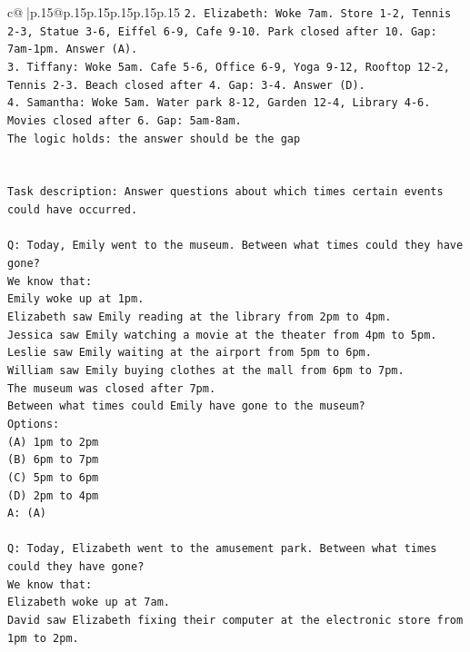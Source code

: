 \documentclass{article}
\begin{document}
{\begin{supertabular}{c@{$\;$}|p{.15\linewidth}@{}p{.15\linewidth}p{.15\linewidth}p{.15\linewidth}p{.15\linewidth}p{.15\linewidth}}
{{{\texttt{2. Elizabeth: Woke 7am. Store 1{-}2, Tennis 2{-}3, Statue 3{-}6, Eiffel 6{-}9, Cafe 9{-}10. Park closed after 10. Gap: 7am{-}1pm. Answer (A).} \\
\texttt{3. Tiffany: Woke 5am. Cafe 5{-}6, Office 6{-}9, Yoga 9{-}12, Rooftop 12{-}2, Tennis 2{-}3. Beach closed after 4. Gap: 3{-}4. Answer (D).} \\
\texttt{4. Samantha: Woke 5am. Water park 8{-}12, Garden 12{-}4, Library 4{-}6. Movies closed after 6. Gap: 5am{-}8am.} \\
\texttt{The logic holds: the answer should be the gap} \\
\\ 
\\ 
\texttt{Task description: Answer questions about which times certain events could have occurred.} \\
\\ 
\texttt{Q: Today, Emily went to the museum. Between what times could they have gone?} \\
\texttt{We know that:} \\
\texttt{Emily woke up at 1pm.} \\
\texttt{Elizabeth saw Emily reading at the library from 2pm to 4pm.} \\
\texttt{Jessica saw Emily watching a movie at the theater from 4pm to 5pm.} \\
\texttt{Leslie saw Emily waiting at the airport from 5pm to 6pm.} \\
\texttt{William saw Emily buying clothes at the mall from 6pm to 7pm.} \\
\texttt{The museum was closed after 7pm.} \\
\texttt{Between what times could Emily have gone to the museum?} \\
\texttt{Options:} \\
\texttt{(A) 1pm to 2pm} \\
\texttt{(B) 6pm to 7pm} \\
\texttt{(C) 5pm to 6pm} \\
\texttt{(D) 2pm to 4pm} \\
\texttt{A: (A)} \\
\\ 
\texttt{Q: Today, Elizabeth went to the amusement park. Between what times could they have gone?} \\
\texttt{We know that:} \\
\texttt{Elizabeth woke up at 7am.} \\
\texttt{David saw Elizabeth fixing their computer at the electronic store from 1pm to 2pm.} \\
}}}
\end{supertabular}}
\end{document}
